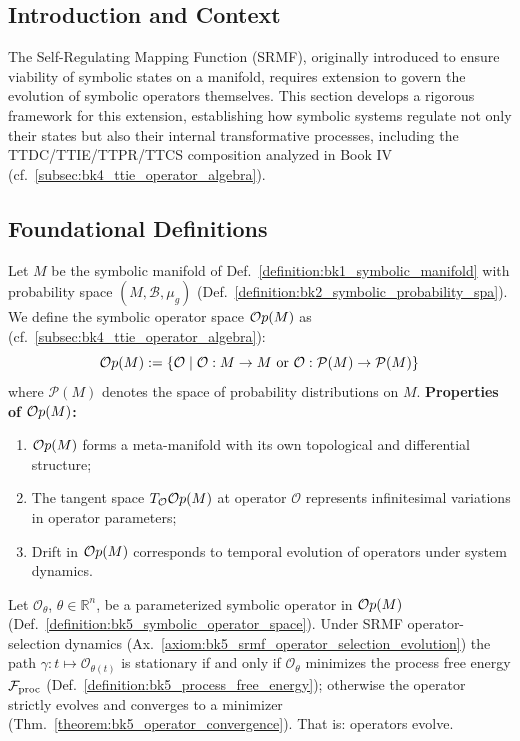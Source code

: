 \subsection{Introduction and Context}
\label{subsec:bk5_srmf_introduction_and_context}
The Self-Regulating Mapping Function (SRMF), originally introduced to ensure viability of symbolic states on a manifold, requires extension to govern the evolution of symbolic operators themselves. This section develops a rigorous framework for this extension, establishing how symbolic systems regulate not only their states but also their internal transformative processes, including the TTDC/TTIE/TTPR/TTCS composition analyzed in Book IV (cf.~\ref{subsec:bk4_ttie_operator_algebra}).
\subsection{Foundational Definitions}
\label{subsec:bk5_srmf_foundational_definitions}
\begin{definition} \label{definition:bk5_symbolic_operator_space}
Let $M$ be the symbolic manifold of Def.~\ref{definition:bk1_symbolic_manifold} with probability space $(M, \mathcal{B}, \mu_g)$ (Def.~\ref{definition:bk2_symbolic_probability_spa}). We define the symbolic operator space $\mathcal{O}p(M)$ as (cf.~\ref{subsec:bk4_ttie_operator_algebra}):
\[
\mathcal{O}p(M) := \left\{ \mathcal{O} \mid \mathcal{O} : M \to M \ \text{or} \ \mathcal{O} : \mathcal{P}(M) \to \mathcal{P}(M) \right\}
\]
where $\mathcal{P}(M)$ denotes the space of probability distributions on $M$.
\textbf{Properties of $\mathcal{O}p(M)$:}
\begin{enumerate}
    \item $\mathcal{O}p(M)$ forms a meta-manifold with its own topological and differential structure;
    \item The tangent space $T_{\mathcal{O}}\mathcal{O}p(M)$ at operator $\mathcal{O}$ represents infinitesimal variations in operator parameters;
    \item Drift in $\mathcal{O}p(M)$ corresponds to temporal evolution of operators under system dynamics.
\end{enumerate}
\end{definition}
\begin{proposition}
\label{proposition:bk5_operator_evolution}
Let $\mathcal{O}_{\theta}$, $\theta \in \mathbb{R}^n$, be a parameterized symbolic operator in $\mathcal{O}p(M)$ (Def.~\ref{definition:bk5_symbolic_operator_space}). Under SRMF operator-selection dynamics (Ax.~\ref{axiom:bk5_srmf_operator_selection_evolution}) the path $\gamma: t \mapsto \mathcal{O}_{\theta(t)}$ is stationary if and only if $\mathcal{O}_{\theta}$ minimizes the process free energy $\mathcal{F}_{\text{proc}}$ (Def.~\ref{definition:bk5_process_free_energy}); otherwise the operator strictly evolves and converges to a minimizer (Thm.~\ref{theorem:bk5_operator_convergence}). That is: operators evolve.
\end{proposition}
